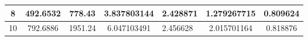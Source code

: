 \begin{table}[]
{\begin{tabular}{|c|c|c|c|l|c|c|}
8                                                                                          & 492.6532                                                                                                                                                                                                                       & 778.43                                                                                                                                                                                                                       & 3.837803144                                                                                                                     & 2.428871                                                                                                                                              & 1.279267715                                                                                & 0.809624                                                                                   \\ \hline
10                                                                                         & 792.6886                                                                                                                                                                                                                       & 1951.24                                                                                                                                                                                                                      & 6.047103491                                                                                                                     & 2.456628                                                                                                                                              & 2.015701164                                                                                & 0.818876                                                                                   \\ \hline
\end{tabular}}
\end{table}

